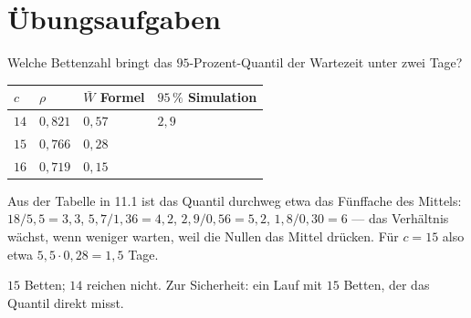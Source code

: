 \section{Übungsaufgaben}

\begin{aufgabe}
Welche Bettenzahl bringt das $95$-Prozent-Quantil der Wartezeit unter zwei Tage?

\loesung
{}
\begin{center}
{\small
\renewcommand{\arraystretch}{1.48}
\begin{tabular}{@{}P{1.4cm}P{1.4cm}P{2.2cm}P{2.4cm}@{}}
\toprule
$c$ & $\rho$ & $\bar W$ Formel & $95\,\%$ Simulation\\
\midrule
$14$ & $0{,}821$ & $0{,}57$ & $2{,}9$\\
$15$ & $0{,}766$ & $0{,}28$ & \\
$16$ & $0{,}719$ & $0{,}15$ & \\
\bottomrule
\end{tabular}}
\end{center}

Aus der Tabelle in 11.1 ist das Quantil durchweg etwa das Fünffache des Mittels: $18/5{,}5 = 3{,}3$, $5{,}7/1{,}36 = 4{,}2$, $2{,}9/0{,}56 = 5{,}2$, $1{,}8/0{,}30 = 6$ --- das Verhältnis wächst, wenn weniger warten, weil die Nullen das Mittel drücken. Für $c=15$ also etwa $5{,}5\cdot0{,}28 = 1{,}5$ Tage.

$15$ Betten; $14$ reichen nicht. Zur Sicherheit: ein Lauf mit $15$ Betten, der das Quantil direkt misst.

\begin{center}
\begin{minipage}{0.88\textwidth}
\end{minipage}
\end{center}
\end{aufgabe}

